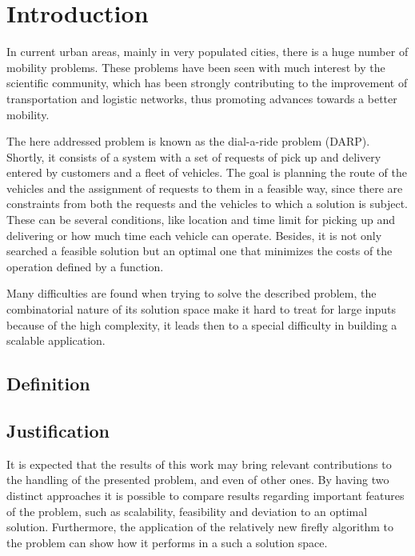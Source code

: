 \documentclass[tuberlin,cic,tc,openright,english,noabntcite]{iiufrgs}
\begin{document}

\tableofcontents


\chapter{Introduction}
In current urban areas, mainly in very populated cities, there is a huge number of mobility problems. These problems have been seen with much interest by the scientific community, which has been strongly contributing to the improvement of transportation and logistic networks, thus promoting advances towards a better mobility.

The here addressed problem is known as the dial-a-ride problem (DARP). Shortly, it consists of a system with a set of requests of pick up and delivery entered by customers and a fleet of vehicles. The goal is planning the route of the vehicles and the assignment of requests to them in a feasible way, since there are constraints from both the requests and the vehicles to which a solution is subject. These can be several conditions, like location and time limit for picking up and delivering or how much time each vehicle can operate. Besides, it is not only searched a feasible solution but an optimal one that minimizes the costs of the operation defined by a function.

Many difficulties are found when trying to solve the described problem, the combinatorial nature of its solution space make it hard to treat for large inputs because of the high complexity, it leads then to a special difficulty in building a scalable application.

\section{Definition}

\section{Justification}
It is expected that the results of this work may bring relevant contributions to the handling of the presented problem, and even of other ones. By having two distinct approaches it is possible to compare results regarding important features of the problem, such as scalability, feasibility and deviation to an optimal solution. Furthermore, the application of the relatively new firefly algorithm to the problem can show how it performs in a such a solution space.
\end{document}
